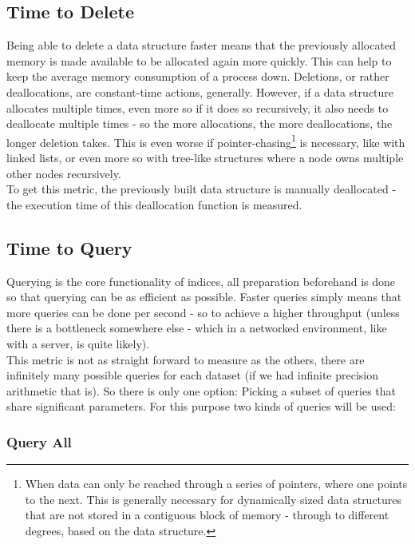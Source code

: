 \subsection{Time to Delete}

Being able to delete a data structure faster means that the previously allocated memory is made available to be allocated again more quickly. This can help to keep the average memory consumption of a process down. Deletions, or rather deallocations, are constant-time actions, generally. However, if a data structure allocates multiple times, even more so if it does so recursively, it also needs to deallocate multiple times - so the more allocations, the more deallocations, the longer deletion takes. This is even worse if pointer-chasing\footnote{When data can only be reached through a series of pointers, where one points to the next. This is generally necessary for dynamically sized data structures that are not stored in a contiguous block of memory - through to different degrees, based on the data structure.} is necessary, like with linked lists, or even more so with tree-like structures where a node owns multiple other nodes recursively.\\
To get this metric, the previously built data structure is manually deallocated - the execution time of this deallocation function is measured.

\subsection{Time to Query}

Querying is the core functionality of indices, all preparation beforehand is done so that querying can be as efficient as possible. Faster queries simply means that more queries can be done per second - so to achieve a higher throughput (unless there is a bottleneck somewhere else - which in a networked environment, like with a server, is quite likely).\\
This metric is not as straight forward to measure as the others, there are infinitely many possible queries for each dataset (if we had infinite precision arithmetic that is). So there is only one option: Picking a subset of queries that share significant parameters. For this purpose two kinds of queries will be used:

\subsubsection{Query All}

